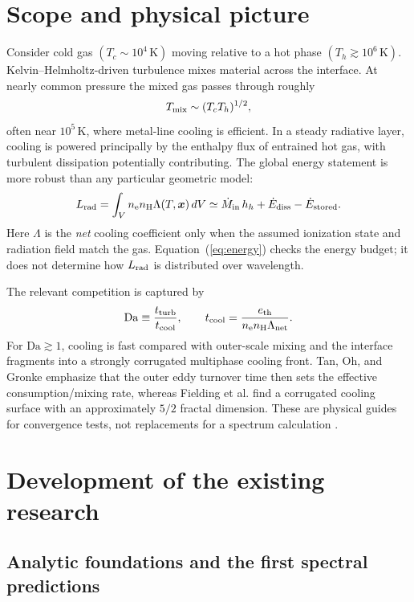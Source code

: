 \documentclass[english,a4paper]{my_memo2}
\newcommand{\nelec}{n_{\rm e}}
\newcommand{\nH}{n_{\rm H}}
\newcommand{\tcool}{t_{\rm cool}}
\newcommand{\Da}{\mathrm{Da}}
\begin{document}
\tableofcontents

\section{Scope and physical picture}

Consider cold gas $(T_c\sim10^4\,\mathrm{K})$ moving relative to a hot
phase $(T_h\gtrsim10^6\,\mathrm{K})$.  Kelvin--Helmholtz-driven turbulence
mixes material across the interface.  At nearly common pressure the mixed gas
passes through roughly
\begin{equation}
 T_{\rm mix}\sim (T_cT_h)^{1/2},
\end{equation}
often near $10^5\,\mathrm{K}$, where metal-line cooling is efficient.  In a
steady radiative layer, cooling is powered principally by the enthalpy flux of
entrained hot gas, with turbulent dissipation potentially contributing.  The
global energy statement is more robust than any particular geometric model:
\begin{equation}
 L_{\rm rad}=\int_V \nelec\nH\Lambda(T,\boldsymbol{x})\,dV
 \simeq \dot M_{\rm in}\,h_h+\dot E_{\rm diss}-\dot E_{\rm stored}.
 \label{eq:energy}
\end{equation}
Here $\Lambda$ is the \emph{net} cooling coefficient only when the assumed
ionization state and radiation field match the gas.  Equation~(\ref{eq:energy})
checks the energy budget; it does not determine how $L_{\rm rad}$ is distributed
over wavelength.

The relevant competition is captured by
\begin{equation}
 \Da\equiv\frac{t_{\rm turb}}{\tcool},\qquad
 \tcool=\frac{e_{\rm th}}{\nelec\nH\Lambda_{\rm net}}.
 \label{eq:da}
\end{equation}
For $\Da\gtrsim1$, cooling is fast compared with outer-scale mixing and the
interface fragments into a strongly corrugated multiphase cooling front.  Tan,
Oh, and Gronke emphasize that the outer eddy turnover time then sets the
effective consumption/mixing rate, whereas Fielding et al. find a corrugated
cooling surface with an approximately $5/2$ fractal dimension.  These are
physical guides for convergence tests, not replacements for a spectrum
calculation \cite{Tan2021,Fielding2020}.

\section{Development of the existing research}

\subsection{Analytic foundations and the first spectral predictions}
\end{document}
